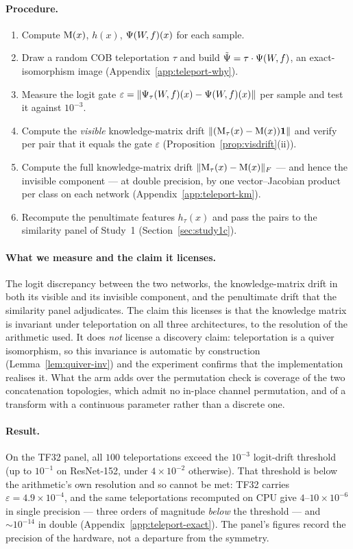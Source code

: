 \paragraph{Procedure.}
\begin{enumerate}
\item Compute $\mathrm{M}(x)$, $h(x)$, $\Psi(W\!,f)(x)$ for each sample.
\item Draw a random COB teleportation $\tau$ and build $\tilde\Psi = \tau
\cdot \Psi(W\!,f)$, an exact-isomorphism image (Appendix~\ref{app:teleport-why}).
\item Measure the logit gate $\varepsilon = \|\Psi_\tau(W\!,f)(x) - \Psi(W\!,f)(x)\|$ per
sample and test it against $10^{-3}$.
\item Compute the \emph{visible} knowledge-matrix drift
$\|(\mathrm{M}_\tau(x)-\mathrm{M}(x))\mathbf 1\|$ and verify per pair that it equals the
gate $\varepsilon$ (Proposition~\ref{prop:visdrift}(ii)).
\item Compute the full knowledge-matrix drift $\|\mathrm{M}_\tau(x)-\mathrm{M}(x)\|_F$ --- and
hence the invisible component --- at double precision, by one vector--Jacobian
product per class on each network (Appendix~\ref{app:teleport-km}).
\item Recompute the penultimate features $h_\tau(x)$ and pass the pairs
to the similarity panel of Study~1 (Section~\ref{sec:study1c}).
\end{enumerate}

\paragraph{What we measure and the claim it licenses.}
The logit discrepancy between the two networks, the knowledge-matrix drift in
both its visible and its invisible component, and the penultimate drift that the
similarity panel adjudicates. The claim this licenses is that the knowledge matrix
is invariant under teleportation on all three architectures, to the resolution of
the arithmetic used. It does \emph{not} license a discovery claim: teleportation
is a quiver isomorphism, so this invariance is automatic by construction
(Lemma~\ref{lem:quiver-inv}) and the experiment confirms that the implementation
realises it. What the arm adds over the permutation check is coverage of the two concatenation
topologies, which admit no in-place channel permutation, and of a transform with a
continuous parameter rather than a discrete one.

\paragraph{Result.}
On the TF32 panel, all $100$ teleportations exceed the $10^{-3}$ logit-drift
threshold (up to $10^{-1}$ on ResNet-152, under $4\times10^{-2}$ otherwise). That
threshold is below the arithmetic's own resolution and so cannot be met: TF32
carries $\varepsilon=4.9\times10^{-4}$, and the same teleportations recomputed on
CPU give $4$--$10\times10^{-6}$ in single precision --- three orders of magnitude
\emph{below} the threshold --- and $\sim\!10^{-14}$ in double
(Appendix~\ref{app:teleport-exact}). The panel's figures record the precision of
the hardware, not a departure from the symmetry.

